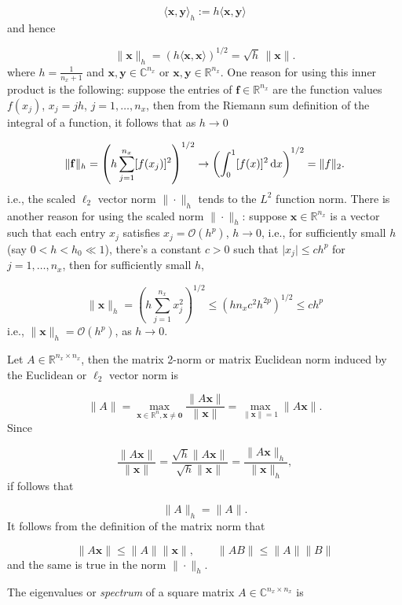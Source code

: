 \documentclass[12pt,a4paper]{article}
\begin{document}
\[
\langle \mathbf{x}, \mathbf{y}\rangle_{h} := h\langle \mathbf{x}, \mathbf{y}\rangle
\]
and hence

\[
\| \mathbf{x} \|_h = \left(h\langle\mathbf{x},\mathbf{x}\rangle\right)^{1/2} = \sqrt{h}\,\| \mathbf{x}\|.
\]
where $h = \frac{1}{n_x+1}$ and $\mathbf{x}, \mathbf{y} \in \mathbb{C}^{n_x}$ or $\mathbf{x}, \mathbf{y} \in \mathbb{R}^{n_x}$.  One reason for using this inner product is the following: suppose the entries of $\mathbf{f} \in \mathbb{R}^{n_x}$ are the function values $f(x_j)$, $x_j = jh$, $j = 1, \ldots, n_x$, then from the Riemann sum definition of the integral of a function, it follows that as $h \to 0$

\[
\| \mathbf{f} \|_h = \left(h\sum_{j=1}^{n_x} [f(x_j)]^2  \right)^{1/2} \to \left( \int_0^1 [f(x)]^2 \,{\rm d}x  \right)^{1/2} = \| f\|_2.
\]
i.e., the scaled $\ell_2$ vector norm $\|\cdot \|_h$ tends to the $L^2$ function norm. There is another reason for using the scaled norm $\|\cdot \|_h$: suppose $\mathbf{x} \in \mathbb{R}^{n_x}$ is a vector such that each entry $x_j$ satisfies $x_j = \mathcal{O}(h^p)$, $h \to 0$, i.e., for sufficiently small $h$ (say $0 < h < h_0\ll 1$), there's a constant $c>0$ such that $\vert x_j \vert \leq c h^p$ for $j = 1, \ldots, n_x$, then for sufficiently small $h$,

\[
\| \mathbf{x} \|_h = \left(h\sum_{j=1}^{n_x} x_j^2  \right)^{1/2} \leq \left(hn_x c^2h^{2p}  \right)^{1/2} \leq ch^p
\]
i.e., $\| \mathbf{x} \|_h = \mathcal{O}(h^p)$, as $h \to 0$.

Let $A \in \mathbb{R}^{n_x \times n_x}$, then the matrix 2-norm or matrix Euclidean norm induced by the Euclidean or $\ell_2$ vector norm is

\[
\| A \| = \max_{\mathbf{x} \in \mathbb{R}^n, \mathbf{x}\neq \mathbf{0}} \frac{\| A\mathbf{x} \|}{\| \mathbf{x}\|} = \max_{\|\mathbf{x}\| =1} \| A\mathbf{x} \|.
\]
Since

\[
\frac{\| A\mathbf{x} \|}{\| \mathbf{x}\|} = \frac{\sqrt{h}\| A\mathbf{x} \|}{\sqrt{h}\| \mathbf{x}\|} =  \frac{\| A\mathbf{x} \|_h}{\| \mathbf{x}\|_h},
\]
if follows that 

\[
\| A \|_h = \| A \|.
\]
It follows from the definition of the matrix norm that

\[
\| A \mathbf{x}\| \leq \| A \| \| \mathbf{x} \|, \qquad \| A B\| \leq \| A\| \|B\|
\]
and the same is true in the norm $\| \cdot \|_h$.

The eigenvalues or \emph{spectrum} of a square matrix $A \in \mathbb{C}^{n_x \times n_x}$ is
\end{document}

